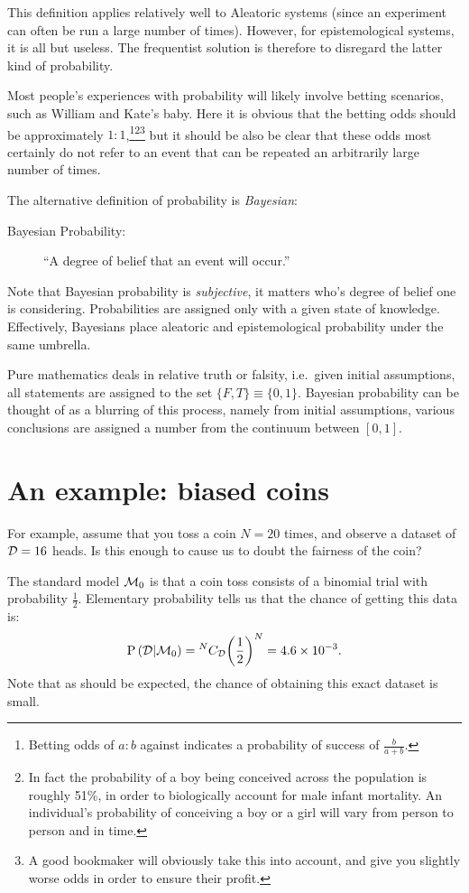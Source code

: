 This definition applies relatively well to Aleatoric systems (since an experiment can often be run a large number of times). However, for epistemological systems, it is all but useless. The frequentist solution is therefore to disregard the latter kind of probability.

Most people's experiences with probability will likely involve betting scenarios, such as William and Kate's baby. Here it is obvious that the betting odds should be approximately $1:1$,\footnote{Betting odds of $a:b$ against indicates a probability of success of $\frac{b}{a+b}$.}\footnote{In fact the probability of a boy being conceived across the population is roughly 51\%, in order to biologically account for male infant mortality. An individual's probability of conceiving a boy or a girl will vary from person to person and in time.}\footnote{A good bookmaker will obviously take this into account, and give you slightly worse odds in order to ensure their profit.} but it should be also be clear that these odds most certainly do not refer to an event that can be repeated an arbitrarily large number of times.

The alternative definition of probability is {\em Bayesian\/}:
\begin{description}
  \item[Bayesian Probability:] ``A degree of belief that an event will occur.'' 
\end{description}
Note that Bayesian probability is {\em subjective}, it matters who's degree of belief one is considering. Probabilities are assigned only with a given state of knowledge. Effectively, Bayesians place aleatoric and epistemological probability under the same umbrella. 

Pure mathematics deals in relative truth or falsity, i.e.\ given initial assumptions, all statements are assigned to the set $\{F,T\}\equiv\{0,1\}$. Bayesian probability can be thought of as a blurring of this process, namely from initial assumptions, various conclusions are assigned a number from the continuum between $[0,1]$.

\section{An example: biased coins}
For example, assume that you toss a coin $N=20$ times, and observe a dataset of $\mathcal{D} = 16$ heads. Is this enough to cause us to doubt the fairness of the coin?

The standard model $\mathcal{M}_0$ is that a coin toss consists of a binomial trial with probability $\frac{1}{2}$. Elementary probability tells us that the chance of getting this data is:
\begin{equation}
  \mathrm{P}\left(\mathcal{D}\middle|\mathcal{M}_0\right)= {^{N}C_{\mathcal{D}}} {\left( \frac{1}{2} \right)}^{N}  = 4.6\times 10^{-3}.
  \label{eqn:bay:M0}
\end{equation}
Note that as should be expected, the chance of obtaining this exact dataset is small. 

